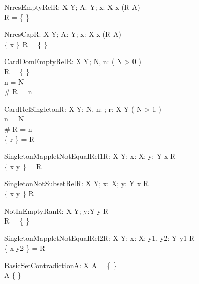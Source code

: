 
\begin{theorem}{NrresEmptyRel}{R: X \rel Y; A: \power Y; x: X}
x \in \dom (R \nrres A) \\
R = \{ \}
\end{theorem}

\begin{theorem}{NrresCap}{R: X \rel Y; A: \power Y; x: X}
x \in \dom (R \nrres A) \\
\{ x \} \cap \dom R = \{ \}
\end{theorem}

\begin{theorem}{CardDomEmptyRel}{R: X \rel Y; \const N, n: \nat}
\eval( N > 0 ) \\
R = \{ \} \\
n = N \\
\# \dom R = n
\end{theorem}

\begin{theorem}{CardRelSingleton}{R: X \rel Y; \const N, n: \nat; r: X \cross Y}
\eval( N > 1 ) \\
n = N \\
\# \dom R = n \\
\{ r \} = R
\end{theorem}

\begin{theorem}{SingletonMappletNotEqualRel1}{R: X \rel Y; x: X; y: Y}
x \notin \dom R \\
\{ x \mapsto y \} = R
\end{theorem}

\begin{theorem}{SingletonNotSubsetRel}{R: X \rel Y; x: X; y: Y}
x \notin \dom R \\
\{ x \mapsto y \} \subset R
\end{theorem}

\begin{theorem}{NotInEmptyRan}{R: X \rel Y; y:Y}
y \in \ran R \\
R = \{ \}
\end{theorem}

\begin{theorem}{SingletonMappletNotEqualRel2}{R: X \rel Y; x: X; \const y1, \const y2: Y}
y1 \in \ran R \\
\{ x \mapsto y2 \} = R
\end{theorem}

\begin{theorem}{BasicSetContradiction}{A: \power X}
A = \{ \} \\
A \neq \{ \}
\end{theorem}

